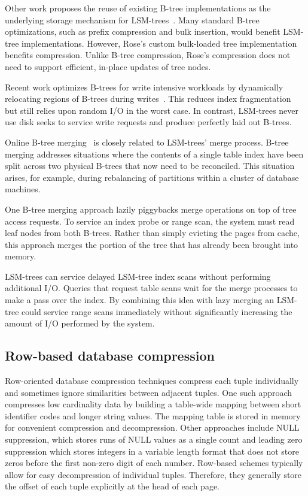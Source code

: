 \documentclass{vldb}
\newcommand{\rowss}{Rose's\xspace}
\newcommand{\xxx}[1]{\textcolor{red}{\bf XXX: #1}}
\renewcommand{\xxx}[1]{\xspace}
\begin{document}
Other work proposes the reuse of existing B-tree implementations as
the underlying storage mechanism for LSM-trees~\cite{cidrPartitionedBTree}.  Many
standard B-tree optimizations, such as prefix compression and bulk insertion,
would benefit LSM-tree implementations.  However, \rowss custom bulk-loaded tree
implementation benefits compression.  Unlike B-tree compression, \rowss
compression does not need to support
efficient, in-place updates of tree nodes.

Recent work optimizes B-trees for write intensive workloads by dynamically
relocating regions of B-trees during
writes~\cite{bTreeHighUpdateRates}.  This reduces index fragmentation
but still relies upon random I/O in the worst case.  In contrast,
LSM-trees never use disk seeks to service write requests and produce
perfectly laid out B-trees.

Online B-tree merging~\cite{onlineMerging} is closely related to
LSM-trees' merge process.  B-tree merging
addresses situations where the contents of a single table index have
been split across two physical B-trees that now need to be reconciled.
This situation arises, for example, during rebalancing of partitions
within a cluster of database machines.

One B-tree merging approach lazily piggybacks merge
operations on top of tree access requests.  To service an index
probe or range scan, the system must read leaf nodes from both B-trees.
Rather than simply evicting the pages from cache, this approach merges
the portion of the tree that has already been brought into
memory.

LSM-trees can service delayed
LSM-tree index scans without performing additional I/O.  Queries that request table scans wait for
the merge processes to make a pass over the index.
By combining this idea with lazy merging an LSM-tree could service
range scans immediately without significantly increasing the amount of
I/O performed by the system.

\subsection{Row-based database compression}
\xxx{shorten?}
Row-oriented database compression techniques compress each tuple
individually and sometimes ignore similarities between adjacent
tuples.  One such approach compresses low cardinality data by building
a table-wide mapping between short identifier codes and longer string
values. The mapping table is stored in memory for convenient
compression and decompression.  Other approaches include NULL
suppression, which stores runs of NULL values as a single count and
leading zero suppression which stores integers in a variable length
format that does not store zeros before the first non-zero digit of each
number.  Row-based schemes typically allow for easy decompression of
individual tuples.  Therefore, they generally store the offset of each
tuple explicitly at the head of each page.
\end{document}
